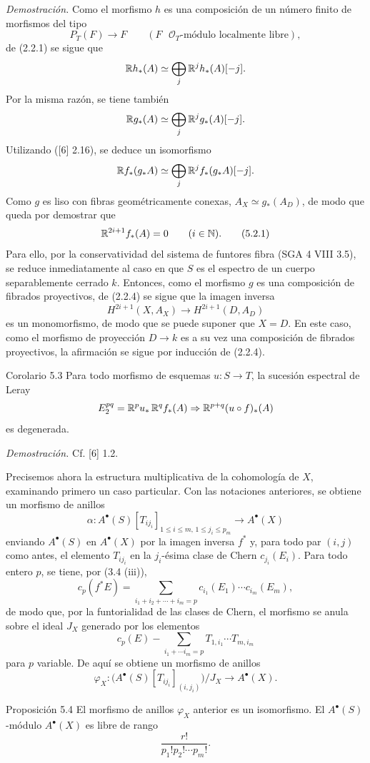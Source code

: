 \emph{Demostración.} Como el morfismo $h$ es una composición de un número finito de morfismos del tipo
\[
P_T(F)\to F\qquad (F\text{ }\mathcal O_T\text{-módulo localmente libre}),
\tag{Q}
\]
de (2.2.1) se sigue que
\[
\mathbb{R} h_*(A)\simeq\bigoplus_j \mathbb{R}^jh_*(A)[-j].
\]
Por la misma razón, se tiene también
\[
\mathbb{R} g_*(A)\simeq\bigoplus_j \mathbb{R}^jg_*(A)[-j].
\]
Utilizando ([6] 2.16), se deduce un isomorfismo
\[
\mathbb{R} f_*(g_*A)\simeq\bigoplus_j \mathbb{R}^j f_*(g_*A)[-j].
\]
Como $g$ es liso con fibras geométricamente conexas, $A_X\simeq g_*(A_D)$, de modo que queda por demostrar que
\[
\mathbb{R}^{2i+1}f_*(A)=0\qquad (i\in\mathbb N).
\tag{5.2.1}
\]
Para ello, por la conservatividad del sistema de funtores fibra (SGA 4 VIII 3.5), se reduce inmediatamente al caso en que $S$ es el espectro de un cuerpo separablemente cerrado $k$. Entonces, como el morfismo $g$ es una composición de fibrados proyectivos, de (2.2.4) se sigue que la imagen inversa
\[
H^{2i+1}(X,A_X)\to H^{2i+1}(D,A_D)
\]
es un monomorfismo, de modo que se puede suponer que $X=D$. En este caso, como el morfismo de proyección $D\to k$ es a su vez una composición de fibrados proyectivos, la afirmación se sigue por inducción de (2.2.4).

\begin{statement}{Corolario 5.3}
Para todo morfismo de esquemas $u:S\to T$, la sucesión espectral de Leray
\[
E_2^{pq}=\mathbb{R}^p u_*\,\mathbb{R}^q f_*(A)\Rightarrow \mathbb{R}^{p+q}(u\circ f)_*(A)
\]
es degenerada.
\end{statement}

\emph{Demostración.} Cf. [6] 1.2.

Precisemos ahora la estructura multiplicativa de la cohomología de $X$, examinando primero un caso particular. Con las notaciones anteriores, se obtiene un morfismo de anillos
\[
\alpha:A^{\bullet}(S)[T_{ij_i}]_{1\le i\le m,\,1\le j_i\le p_m}\to A^{\bullet}(X)
\]
enviando $A^\bullet(S)$ en $A^\bullet(X)$ por la imagen inversa $f^*$ y, para todo par $(i,j)$ como antes, el elemento $T_{ij_i}$ en la $j_i$-ésima clase de Chern $c_{j_i}(E_i)$. Para todo entero $p$, se tiene, por (3.4 (iii)),
\[
c_p(f^*E)=\sum_{i_1+i_2+\cdots+i_m=p}c_{i_1}(E_1)\cdots c_{i_m}(E_m),
\]
de modo que, por la funtorialidad de las clases de Chern, el morfismo se anula sobre el ideal $J_X$ generado por los elementos
\[
c_p(E)-\sum_{i_1+\cdots i_m=p}T_{1,i_1}\cdots T_{m,i_m}
\]
para $p$ variable. De aquí se obtiene un morfismo de anillos
\[
\varphi_X:\bigl(A^\bullet(S)[T_{ij_i}]_{(i,j_i)}\bigr)/J_X\to A^\bullet(X).
\]

\begin{statement}{Proposición 5.4}
El morfismo de anillos $\varphi_X$ anterior es un isomorfismo. El $A^\bullet(S)$-módulo $A^\bullet(X)$ es libre de rango
\[
\frac{r!}{p_1!p_2!\cdots p_m!}.
\]
\end{statement}
